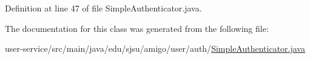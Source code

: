 Definition at line 47 of file Simple\+Authenticator.\+java.



The documentation for this class was generated from the following file\+:\begin{DoxyCompactItemize}
\item 
user-\/service/src/main/java/edu/sjsu/amigo/user/auth/\hyperlink{_simple_authenticator_8java}{Simple\+Authenticator.\+java}\end{DoxyCompactItemize}
